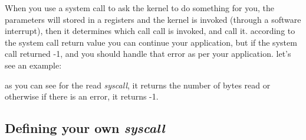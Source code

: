 \documentclass{article}
\begin{document}
When you use a system call to ask the kernel to do something for you, the parameters will stored in a registers and the kernel is invoked (through a software interrupt), then it determines which call call is invoked, and call it.
according to the system call return value you can continue your application, but if the system call returned -1, and you should handle that error as per your application. let's see an example:



as you can see for the read \textit{syscall}, it returns the number of bytes read or otherwise if there is an error, it returns -1.\\

\subsection{Defining your own \textit{syscall}}
\end{document}
